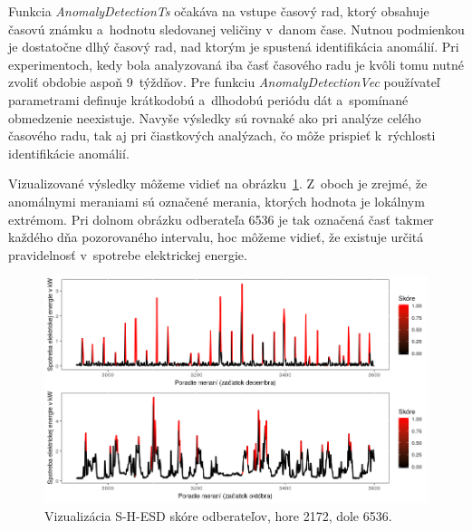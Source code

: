 \documentclass[a4paper,twoside,slovak,12pt,appendix]{article}
\begin{document}
\noindent
Funkcia \textit{AnomalyDetectionTs} očakáva na vstupe časový rad, ktorý obsahuje
časovú známku a~hodnotu sledovanej veličiny v~danom čase. Nutnou podmienkou je
dostatočne dlhý časový rad, nad ktorým je spustená identifikácia anomálií. Pri
experimentoch, kedy bola analyzovaná iba časť časového radu je kvôli tomu nutné
zvoliť obdobie aspoň 9~týždňov. Pre funkciu \textit{AnomalyDetectionVec}
používateľ parametrami definuje krátkodobú a~dlhodobú periódu dát a~spomínané
obmedzenie neexistuje. Navyše výsledky sú rovnaké ako pri analýze celého
časového radu, tak aj pri čiastkových analýzach, čo môže prispieť k~rýchlosti
identifikácie anomálií.

Vizualizované výsledky môžeme vidieť na obrázku~\ref{fig:results-twitter}.
Z~oboch je zrejmé, že anomálnymi meraniami sú označené merania, ktorých hodnota
je lokálnym extrémom. Pri dolnom obrázku odberateľa 6536 je tak označená časť
takmer každého dňa pozorovaného intervalu, hoc môžeme vidieť, že existuje určitá
pravidelnosť v~spotrebe elektrickej energie.

\begin{figure}[htbp]
  \centering
  \includegraphics[width=\textwidth]{results_twitter.png}
  \caption[Vizualizácia S-H-ESD skóre odberateľov.]{Vizualizácia S-H-ESD skóre odberateľov, hore 2172, dole 6536.}
  \label{fig:results-twitter}
\end{figure}
\end{document}
